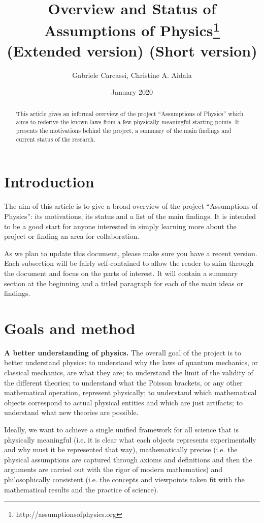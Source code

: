 \documentclass[twocolumn]{article}
\title{Overview and Status of Assumptions of Physics\footnote{http://assumptionsofphysics.org} \\
\ifextended (Extended version)
\else (Short version)
\fi}
\author{Gabriele Carcassi, Christine A. Aidala}
\date{January 2020}
\begin{document}
\maketitle

\begin{abstract}
	This article gives an informal overview of the project ``Assumptions of Physics'' which aims to rederive the known laws from a few physically meaningful starting points. It presents the motivations behind the project, a summary of the main findings and current status of the research.	
\end{abstract}

\section{Introduction}

The aim of this article is to give a broad overview of the project ``Assumptions of Physics'': its motivations, its status and a list of the main findings. It is intended to be a good start for anyone interested in simply learning more about the project or finding an area for collaboration.

As we plan to update this document, please make sure you have a recent version. Each subsection will be fairly self-contained to allow the reader to skim through the document and focus on the parts of interest. It will contain a summary section at the beginning and a titled paragraph for each of the main ideas or findings.

\section{Goals and method}

\textbf{A better understanding of physics.} The overall goal of the project is to better understand physics: to understand why the laws of quantum mechanics, or classical mechanics, are what they are; to understand the limit of the validity of the different theories; to understand what the Poisson brackets, or any other mathematical operation, represent physically; to understand which mathematical objects correspond to actual physical entities and which are just artifacts; to understand what new theories are possible.

Ideally, we want to achieve a single unified framework for all science that is physically meaningful (i.e. it is clear what each objects represents experimentally and why must it be represented that way), mathematically precise (i.e. the physical assumptions are captured through axioms and definitions and then the arguments are carried out with the rigor of modern mathematics) and philosophically consistent (i.e. the concepts and viewpoints taken fit with the mathematical results and the practice of science).
\end{document}
